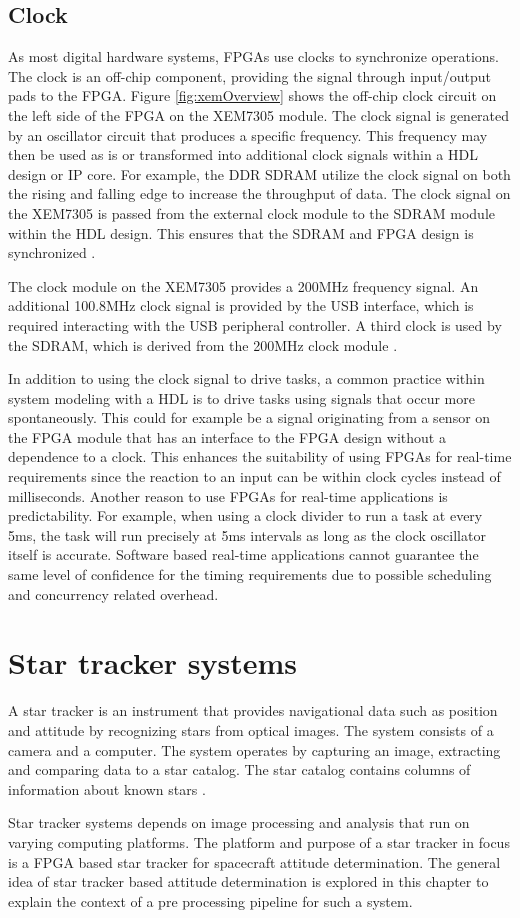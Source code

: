 \documentclass[12pt]{report}
\begin{document}
\section{Clock}
As most digital hardware systems, FPGAs use clocks to synchronize operations. The clock is an off-chip component, providing the signal through input/output pads to the FPGA. Figure \ref{fig:xemOverview} shows the off-chip clock circuit on the left side of the FPGA on the XEM7305 module. The clock signal is generated by an oscillator circuit that produces a specific frequency. This frequency may then be used as is or transformed into additional clock signals within a HDL design or IP core. For example, the DDR SDRAM utilize the clock signal on both the rising and falling edge to increase the throughput of data. The clock signal on the XEM7305 is passed from the external clock module to the SDRAM module within the HDL design. This ensures that the SDRAM and FPGA design is synchronized \citep{XEM7305Man}.
\par
The clock module on the XEM7305 provides a 200MHz frequency signal. An additional 100.8MHz clock signal is provided by the USB interface, which is required interacting with the USB peripheral controller. A third clock is used by the SDRAM, which is derived from the 200MHz clock module \citep{XEM7305Man}.
\par
In addition to using the clock signal to drive tasks, a common practice within system modeling with a HDL is to drive tasks using signals that occur more spontaneously. This could for example be a signal originating from a sensor on the FPGA module that has an interface to the FPGA design without a dependence to a clock. This enhances the suitability of using FPGAs for real-time requirements since the reaction to an input can be within clock cycles instead of milliseconds. Another reason to use FPGAs for real-time applications is predictability. For example, when using a clock divider to run a task at every 5ms, the task will run precisely at 5ms intervals as long as the clock oscillator itself is accurate. Software based real-time applications cannot guarantee the same level of confidence for the timing requirements due to possible scheduling and concurrency related overhead.

\chapter{Star tracker systems}
A star tracker is an instrument that provides navigational data such as position and attitude by recognizing stars from optical images. The system consists of a camera and a computer. The system operates by capturing an image, extracting and comparing data to a star catalog. The star catalog contains columns of information about known stars \citep{SatDesgin}.
\par
Star tracker systems depends on image processing and analysis that run on varying computing platforms. The platform and purpose of a star tracker in focus is a FPGA based star tracker for spacecraft attitude determination. The general idea of star tracker based attitude determination is explored in this chapter to explain the context of a pre processing pipeline for such a system.
\end{document}
